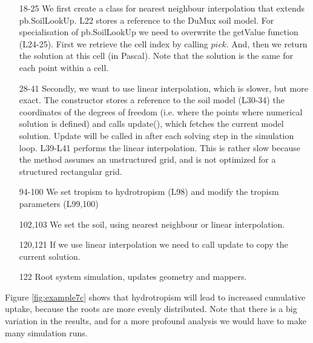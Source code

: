 \begin{itemize}
\item[18-25] We first create a class for nearest neighbour interpolation that extends pb.SoilLookUp. L22 stores a reference to the DuMux soil model. For specialisation of pb.SoilLookUp we need to overwrite the getValue function (L24-25). First we retrieve the cell index by calling $pick$. And, then we return the solution at this cell (in Pascal). Note that the solution is the same for each point within a cell. 
\item[28-41] Secondly, we want to use linear interpolation, which is slower, but more exact. The constructor stores a reference to the soil model (L30-34) the coordinates of the degrees of freedom (i.e. where the points where numerical solution is defined) and calls update(), which fetches the current model solution. Update will be called in after each solving step in the simulation loop. L39-L41 performs the linear interpolation. This is rather slow because the method assumes an unstructured grid, and is not optimized for a structured rectangular grid. 
\item[94-100] We set tropism to hydrotropism (L98) and modify the tropism parameters (L99,100)
\item[102,103] We set the soil, using nearest neighbour or linear interpolation.
\item[120,121] If we use linear interpolation we need to call update to copy the current solution. 
\item[122] Root system simulation, updates geometry and mappers.

\end{itemize}

Figure \ref{fig:example7c} shows that hydrotropism will lead to increased cumulative uptake, because the roots are more evenly distributed. Note that there is a big variation in the results, and for a more profound analysis we would have to make many simulation runs. 




